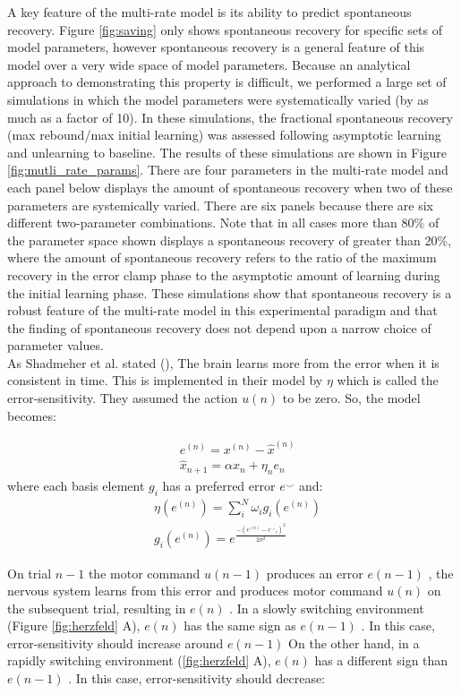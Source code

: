 \documentclass[9pt,twocolumn]{paper-template}
\begin{document}
A key feature of the multi-rate model is its ability to predict spontaneous recovery. Figure \ref{fig:saving} only shows spontaneous recovery for
specific sets of model parameters, however spontaneous recovery is a general feature of this
model over a very wide space of model parameters. Because an analytical approach to
demonstrating this property is difficult, we performed a large set of simulations in which the
model parameters were systematically varied (by as much as a factor of 10). In these simulations, the fractional spontaneous
recovery (max rebound/max initial learning) was assessed following asymptotic learning and
unlearning to baseline. The results of these simulations are shown in Figure \ref{fig:mutli_rate_params}. There are four
parameters in the multi-rate model and each panel below displays the amount of
spontaneous recovery when two of these parameters are systemically varied. There are six
panels because there are six different two-parameter combinations. Note that in all cases
more than 80\% of the parameter space shown displays a spontaneous recovery of greater
than 20\%, where the amount of spontaneous recovery refers to the ratio of the maximum
recovery in the error clamp phase to the asymptotic amount of learning during the initial
learning phase. These simulations show that spontaneous recovery is a robust feature of
the multi-rate model in this experimental paradigm and that the finding of spontaneous
recovery does not depend upon a narrow choice of parameter values.\\



As Shadmeher et al. stated (\cite{mem_error}), The brain learns more from the error when it is consistent in time. This is implemented in their model by $\eta$ which is called the error-sensitivity. They assumed the action $u(n)$ to be zero. So, the model becomes:


\begin{eqnarray*}
& e^{(n)} = x^{(n)}-\hat{x}^{(n)}\\
& \hat{x}_{n+1} = \alpha \hat{x}_n + \eta_ne_n
\end{eqnarray*}
where  each basis element $g_i$ has a preferred error $e^\smallsmile$ and:
\begin{eqnarray*}
& \eta(e^{(n)}) = \sum_i^N \omega_ig_i(e^{(n)})\\
&g_i(e^{(n)}) = e^{\frac{-(e^{(n)}-{e^\smallsmile}_i)^2}{2\sigma^2}}
\end{eqnarray*}

On trial $n-1$ the motor command $u(n-1)$ produces an error $e(n-1)$ , the nervous system learns from this error and produces motor command $u (n)$ on the subsequent trial, resulting in $e(n)$ . In a slowly switching environment (Figure \ref{fig:herzfeld} A), $e(n)$ has the same sign as $e(n-1)$ . In this case, error-sensitivity should increase around $e(n-1)$ On the other hand, in a rapidly switching environment (\ref{fig:herzfeld} A), $e(n)$ has a different sign than $e(n-1)$ . In this case, error-sensitivity should decrease:
\end{document}
